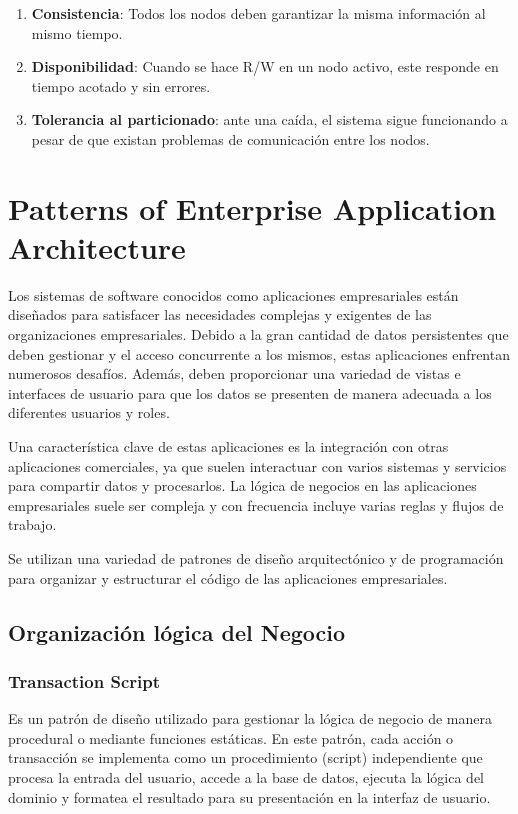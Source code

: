 \documentclass{article}
\begin{document}
		\pagebreak
		\begin{enumerate}
			\item {\textbf{Consistencia}}: Todos los nodos deben garantizar la misma información al	mismo tiempo.
			
			\item {\textbf{Disponibilidad}}: Cuando se hace	R/W en un nodo activo, este responde en tiempo acotado y sin errores.
			
			\item {\textbf{Tolerancia al particionado}}: ante una caída, el sistema sigue funcionando a pesar de que existan problemas de comunicación entre los nodos.
		\end{enumerate}
		
		
		
		
		\section{Patterns of Enterprise Application Architecture}
		Los sistemas de software conocidos como aplicaciones empresariales están diseñados para satisfacer las necesidades complejas y exigentes de las organizaciones empresariales. Debido a la gran cantidad de datos persistentes que deben gestionar y el acceso concurrente a los mismos, estas aplicaciones enfrentan numerosos desafíos. Además, deben proporcionar una variedad de vistas e interfaces de usuario para que los datos se presenten de manera adecuada a los diferentes usuarios y roles.
		
		Una característica clave de estas aplicaciones es la integración con otras aplicaciones comerciales, ya que suelen interactuar con varios sistemas y servicios para compartir datos y procesarlos. La lógica de negocios en las aplicaciones empresariales suele ser compleja y con frecuencia incluye varias reglas y flujos de trabajo.
		
		Se utilizan una variedad de patrones de diseño arquitectónico y de programación para organizar y estructurar el código de las aplicaciones empresariales. 
		
		\subsection{Organización lógica del Negocio}\label{sec:orga_logica_negocios}
		\subsubsection{Transaction Script}
		Es un patrón de diseño utilizado para gestionar la lógica de negocio de manera procedural o mediante funciones estáticas. En este patrón, cada acción o transacción se implementa como un procedimiento (script) independiente que procesa la entrada del usuario, accede a la base de datos, ejecuta la lógica del dominio y formatea el resultado para su presentación en la interfaz de usuario.
\end{document}
